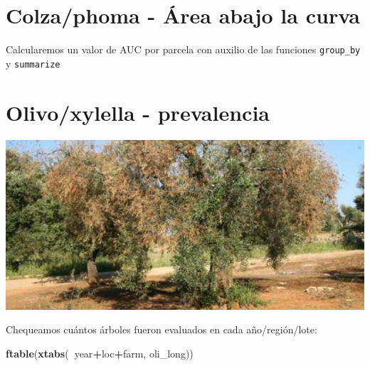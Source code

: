 \documentclass[]{book}
\newenvironment{Shaded}{\begin{snugshade}}{\end{snugshade}}
\newcommand{\CommentTok}[1]{\textcolor[rgb]{0.56,0.35,0.01}{\textit{#1}}}
\newcommand{\DataTypeTok}[1]{\textcolor[rgb]{0.13,0.29,0.53}{#1}}
\newcommand{\KeywordTok}[1]{\textcolor[rgb]{0.13,0.29,0.53}{\textbf{#1}}}
\newcommand{\NormalTok}[1]{#1}
\newcommand{\OperatorTok}[1]{\textcolor[rgb]{0.81,0.36,0.00}{\textbf{#1}}}
\newcommand{\StringTok}[1]{\textcolor[rgb]{0.31,0.60,0.02}{#1}}
\begin{document}
\hypertarget{colzaphoma---uxe1rea-abajo-la-curva}{%
\chapter{Colza/phoma - Área abajo la
curva}\label{colzaphoma---uxe1rea-abajo-la-curva}}

Calcularemos un valor de AUC por parcela con auxilio de las funciones
\texttt{group\_by} y \texttt{summarize}

\begin{Shaded}
\end{Shaded}

\hypertarget{olivoxylella---prevalencia}{%
\chapter{Olivo/xylella - prevalencia}\label{olivoxylella---prevalencia}}

\includegraphics{fig/xylella.jpg}

Chequeamos cuántos árboles fueron evaluados en cada año/región/lote:

\begin{Shaded}
\begin{Highlighting}[]
\KeywordTok{ftable}\NormalTok{(}\KeywordTok{xtabs}\NormalTok{(}\OperatorTok{~}\NormalTok{year}\OperatorTok{+}\NormalTok{loc}\OperatorTok{+}\NormalTok{farm, oli_long))}
\end{Highlighting}
\end{Shaded}
\end{document}
